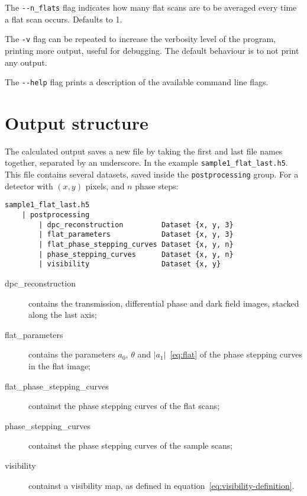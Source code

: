 The \verb|--n_flats| flag indicates how many flat scans are to be
averaged every time a flat scan occurs. Defaults to 1.


The \verb|-v| flag can be repeated to increase the verbosity level of the
program, printing more output, useful for debugging. The default behaviour
is to not print any output.

The \verb|--help| flag prints a description of the available command line
flags.

\section{Output structure}
The calculated output saves a new file by taking the first and last file
names together, separated by an underscore. In the example \verb|sample1_flat_last.h5|.
This file contains several datasets, saved inside the \texttt{postprocessing}
group. For a detector with $(x, y)$ pixels, and $n$ phase steps:
\begin{lstlisting}
sample1_flat_last.h5
    | postprocessing
        | dpc_reconstruction         Dataset {x, y, 3}
        | flat_parameters            Dataset {x, y, 3}
        | flat_phase_stepping_curves Dataset {x, y, n}
        | phase_stepping_curves      Dataset {x, y, n}
        | visibility                 Dataset {x, y}
\end{lstlisting}

\begin{description}
    \item[dpc\_reconstruction] contains the transmission, differential
        phase and dark field images, stacked along the last axis;
    \item[flat\_parameters] contains the parameters $a_0$, $\theta$
        and $|a_1|$~\eqref{eq:flat} of the phase stepping curves in the flat
        image;
    \item[flat\_phase\_stepping\_curves] containst the phase stepping
        curves of the flat scans;
    \item[phase\_stepping\_curves] containst the phase stepping
        curves of the sample scans;
    \item[visibility] containst a visibility map, as defined in
        equation~\eqref{eq:visibility-definition}.
\end{description}
